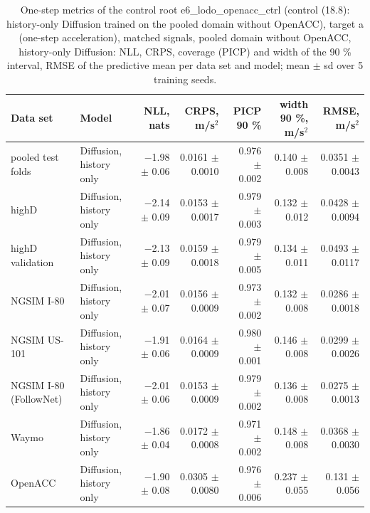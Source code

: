 \begin{table}[htbp]
\centering
\footnotesize
\caption{One-step metrics of the control root e6\_lodo\_openacc\_ctrl (control (18.8): history-only Diffusion trained on the pooled domain without OpenACC), target a (one-step acceleration), matched signals, pooled domain without OpenACC, history-only Diffusion: NLL, CRPS, coverage (PICP) and width of the 90 \% interval, RMSE of the predictive mean per data set and model; mean $\pm$ sd over 5 training seeds.}
\label{tab:t1-one-step--lodo-openacc-ctrl--a}
\begin{tabular}{llrrrrr}
\toprule
Data set & Model & NLL, nats & CRPS, m/s$^2$ & PICP 90 \% & width 90 \%, m/s$^2$ & RMSE, m/s$^2$ \\
\midrule
pooled test folds & Diffusion, history only & $-$1.98 $\pm$ 0.06 & 0.0161 $\pm$ 0.0010 & 0.976 $\pm$ 0.002 & 0.140 $\pm$ 0.008 & 0.0351 $\pm$ 0.0043 \\
\midrule
highD & Diffusion, history only & $-$2.14 $\pm$ 0.09 & 0.0153 $\pm$ 0.0017 & 0.979 $\pm$ 0.003 & 0.132 $\pm$ 0.012 & 0.0428 $\pm$ 0.0094 \\
\midrule
highD validation & Diffusion, history only & $-$2.13 $\pm$ 0.09 & 0.0159 $\pm$ 0.0018 & 0.979 $\pm$ 0.005 & 0.134 $\pm$ 0.011 & 0.0493 $\pm$ 0.0117 \\
\midrule
NGSIM I-80 & Diffusion, history only & $-$2.01 $\pm$ 0.07 & 0.0156 $\pm$ 0.0009 & 0.973 $\pm$ 0.002 & 0.132 $\pm$ 0.008 & 0.0286 $\pm$ 0.0018 \\
\midrule
NGSIM US-101 & Diffusion, history only & $-$1.91 $\pm$ 0.06 & 0.0164 $\pm$ 0.0009 & 0.980 $\pm$ 0.001 & 0.146 $\pm$ 0.008 & 0.0299 $\pm$ 0.0026 \\
\midrule
NGSIM I-80 (FollowNet) & Diffusion, history only & $-$2.01 $\pm$ 0.06 & 0.0153 $\pm$ 0.0009 & 0.979 $\pm$ 0.002 & 0.136 $\pm$ 0.008 & 0.0275 $\pm$ 0.0013 \\
\midrule
Waymo & Diffusion, history only & $-$1.86 $\pm$ 0.04 & 0.0172 $\pm$ 0.0008 & 0.971 $\pm$ 0.002 & 0.148 $\pm$ 0.008 & 0.0368 $\pm$ 0.0030 \\
\midrule
OpenACC & Diffusion, history only & $-$1.90 $\pm$ 0.08 & 0.0305 $\pm$ 0.0080 & 0.976 $\pm$ 0.006 & 0.237 $\pm$ 0.055 & 0.131 $\pm$ 0.056 \\
\bottomrule
\end{tabular}
\end{table}
